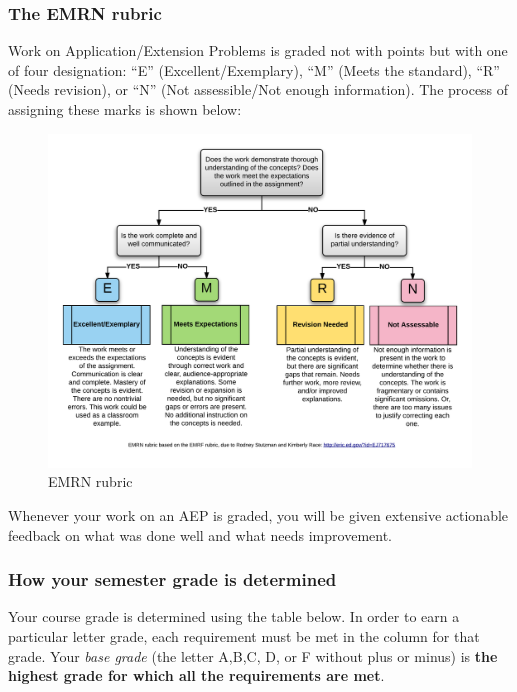 \documentclass[]{article}
\begin{document}
\hypertarget{the-emrn-rubric}{%
\subsubsection{The EMRN rubric}\label{the-emrn-rubric}}

Work on Application/Extension Problems is graded not with points but
with one of four designation: ``E'' (Excellent/Exemplary), ``M'' (Meets
the standard), ``R'' (Needs revision), or ``N'' (Not assessible/Not
enough information). The process of assigning these marks is shown
below:

\begin{figure}
\centering
\includegraphics{EMRN.png}
\caption{EMRN rubric}
\end{figure}

Whenever your work on an AEP is graded, you will be given extensive
actionable feedback on what was done well and what needs improvement.

\hypertarget{how-your-semester-grade-is-determined}{%
\subsubsection{How your semester grade is
determined}\label{how-your-semester-grade-is-determined}}

Your course grade is determined using the table below. In order to earn
a particular letter grade, each requirement must be met in the column
for that grade. Your \emph{base grade} (the letter A,B,C, D, or F
without plus or minus) is \textbf{the highest grade for which all the
requirements are met}.
\end{document}
